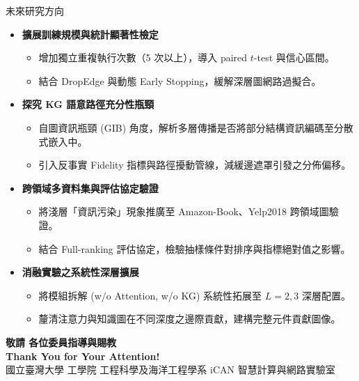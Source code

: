 \documentclass[aspectratio=169, 10pt]{beamer}
\begin{document}
\begin{frame}{未來研究方向}
  \vspace{-0.15cm}
  \begin{itemize}
    \setlength{\itemsep}{2pt}
    \item \alert{\textbf{擴展訓練規模與統計顯著性檢定}}
      \begin{itemize}\small
        \item 增加獨立重複執行次數（5 次以上），導入 paired $t$-test 與信心區間。
        \item 結合 DropEdge 與動態 Early Stopping，緩解深層圖網路過擬合。
      \end{itemize}

    \item \alert{\textbf{探究 KG 語意路徑充分性瓶頸}}
      \begin{itemize}\small
        \item 自圖資訊瓶頸 (GIB) 角度，解析多層傳播是否將部分結構資訊編碼至分散式嵌入中。
        \item 引入反事實 Fidelity 指標與路徑擾動管線，減緩邊遮罩引發之分佈偏移。
      \end{itemize}

    \item \alert{\textbf{跨領域多資料集與評估協定驗證}}
      \begin{itemize}\small
        \item 將淺層「資訊污染」現象推廣至 Amazon-Book、Yelp2018 跨領域圖驗證。
        \item 結合 Full-ranking 評估協定，檢驗抽樣條件對排序與指標絕對值之影響。
      \end{itemize}

    \item \alert{\textbf{消融實驗之系統性深層擴展}}
      \begin{itemize}\small
        \item 將模組拆解 (w/o Attention, w/o KG) 系統性拓展至 $L=2, 3$ 深層配置。
        \item 釐清注意力與知識圖在不同深度之邊際貢獻，建構完整元件貢獻圖像。
      \end{itemize}
  \end{itemize}
\end{frame}

{
  \def\insertsection{}
  \begin{frame}{}
    \begin{center}
      \vspace{0.8cm}
      {\Huge\bfseries\color{ntublue} 敬請 各位委員指導與賜教}\\[0.6cm]
      {\fontsize{18pt}{22pt}\selectfont\bfseries\color{ntugold} Thank You for Your Attention!}\\[1.4cm]
      \small 國立臺灣大學 工學院 工程科學及海洋工程學系 iCAN 智慧計算與網路實驗室
    \end{center}
  \end{frame}
}
\end{document}
